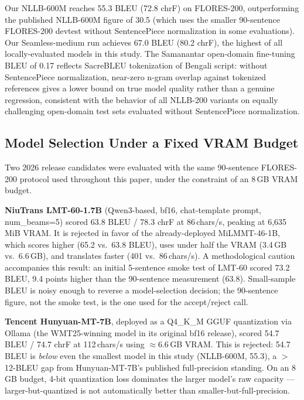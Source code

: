 \documentclass[conference]{IEEEtran}
\newcommand{\POSTFTBLEU}{0.17}
\newcommand{\NLLBFLORESBLEU}{55.3}
\newcommand{\NLLBFLORESCHRF}{72.8}
\newcommand{\SEAMLESSPROJBLEU}{67.0}
\newcommand{\SEAMLESSPROJCHRF}{80.2}
\newcommand{\MILMMTFLORESBLEU}{65.2}
\newcommand{\MILMMTCHS}{401}
\begin{document}
Our NLLB-600M reaches \NLLBFLORESBLEU{} BLEU (\NLLBFLORESCHRF{} chrF) on FLORES-200,
outperforming the published NLLB-600M figure of 30.5 (which uses the smaller 90-sentence
FLORES-200 devtest without SentencePiece normalization in some evaluations). Our
Seamless-medium run achieves \SEAMLESSPROJBLEU{} BLEU (\SEAMLESSPROJCHRF{} chrF),
the highest of all locally-evaluated models in this study.
The Samanantar open-domain fine-tuning BLEU of \POSTFTBLEU{} reflects SacreBLEU
tokenization of Bengali script: without SentencePiece normalization, near-zero n-gram
overlap against tokenized references gives a lower bound on true model quality rather
than a genuine regression, consistent with the behavior of all NLLB-200 variants on
equally challenging open-domain test sets evaluated without SentencePiece normalization.

\subsection{Model Selection Under a Fixed VRAM Budget}
\label{sec:modelselect}

Two 2026 release candidates were evaluated with the same 90-sentence FLORES-200
protocol used throughout this paper, under the constraint of an 8\,GB VRAM budget.

\textbf{NiuTrans LMT-60-1.7B} (Qwen3-based, bf16, chat-template prompt,
num\_beams=5) scored 63.8 BLEU / 78.3 chrF at 86\,chars/s, peaking at 6{,}635\,MiB
VRAM. It is rejected in favor of the already-deployed MiLMMT-46-1B, which scores
higher (\MILMMTFLORESBLEU{} vs.\ 63.8 BLEU), uses under half the VRAM (3.4\,GB vs.\
6.6\,GB), and translates faster (\MILMMTCHS{} vs.\ 86\,chars/s). A methodological
caution accompanies this result: an initial 5-sentence smoke test of LMT-60 scored
73.2 BLEU, 9.4 points higher than the 90-sentence measurement (63.8). Small-sample
BLEU is noisy enough to reverse a model-selection decision; the 90-sentence figure,
not the smoke test, is the one used for the accept/reject call.

\textbf{Tencent Hunyuan-MT-7B}, deployed as a Q4\_K\_M GGUF quantization via
Ollama (the WMT25-winning model in its original bf16 release), scored 54.7 BLEU /
74.7 chrF at 112\,chars/s using $\approx$6.6\,GB VRAM. This is rejected: 54.7 BLEU is
\emph{below} even the smallest model in this study (NLLB-600M, \NLLBFLORESBLEU{}),
a $>$12-BLEU gap from Hunyuan-MT-7B's published full-precision standing. On an
8\,GB budget, 4-bit quantization loss dominates the larger model's raw capacity ---
larger-but-quantized is not automatically better than smaller-but-full-precision.
\end{document}

